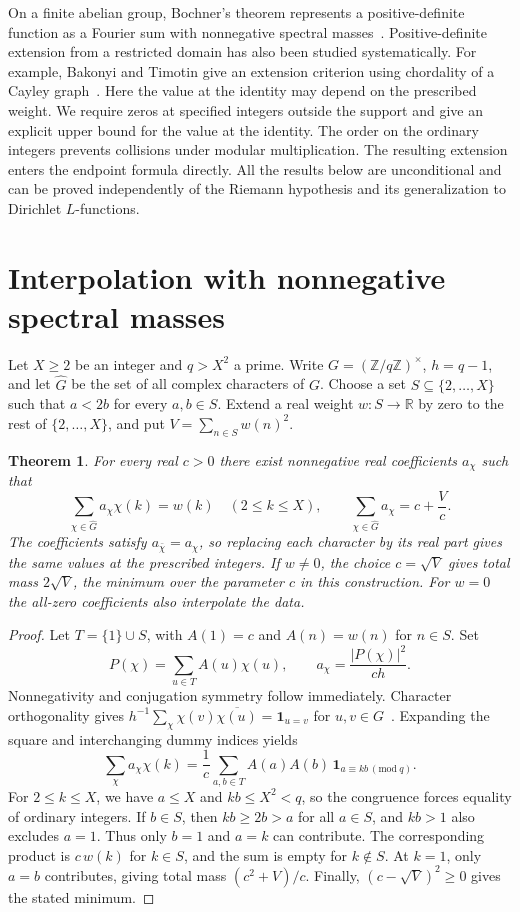 \documentclass[11pt,a4paper]{article}
\newtheorem{theorem}{Theorem}
\newcommand{\ind}{\mathbf{1}}
\newcommand{\R}{\mathbb{R}}
\newcommand{\Z}{\mathbb{Z}}
\begin{document}
On a finite abelian group, Bochner's theorem represents a positive-definite function as a Fourier sum with nonnegative spectral masses~\cite{rudin}. Positive-definite extension from a restricted domain has also been studied systematically. For example, Bakonyi and Timotin give an extension criterion using chordality of a Cayley graph~\cite{bt}. Here the value at the identity may depend on the prescribed weight. We require zeros at specified integers outside the support and give an explicit upper bound for the value at the identity. The order on the ordinary integers prevents collisions under modular multiplication. The resulting extension enters the endpoint formula directly. All the results below are unconditional and can be proved independently of the Riemann hypothesis and its generalization to Dirichlet $L$-functions.

\section{Interpolation with nonnegative spectral masses}
Let $X\ge2$ be an integer and $q>X^2$ a prime. Write $G=(\Z/q\Z)^\times$, $h=q-1$, and let $\widehat G$ be the set of all complex characters of $G$. Choose a set $S\subseteq\{2,\ldots,X\}$ such that $a<2b$ for every $a,b\in S$. Extend a real weight $w\colon S\to\R$ by zero to the rest of $\{2,\ldots,X\}$, and put $V=\sum_{n\in S}w(n)^2$.

\begin{theorem}\label{thm:window}
For every real $c>0$ there exist nonnegative real coefficients $a_\chi$ such that
\[
  \sum_{\chi\in\widehat G}a_\chi\chi(k)=w(k)\quad(2\le k\le X),
  \qquad \sum_{\chi\in\widehat G}a_\chi=c+\frac{V}{c}.
\]
The coefficients satisfy $a_{\bar\chi}=a_\chi$, so replacing each character by its real part gives the same values at the prescribed integers. If $w\ne0$, the choice $c=\sqrt V$ gives total mass $2\sqrt V$, the minimum over the parameter $c$ in this construction. For $w=0$ the all-zero coefficients also interpolate the data.
\end{theorem}

\begin{proof}
Let $T=\{1\}\cup S$, with $A(1)=c$ and $A(n)=w(n)$ for $n\in S$. Set
\[
  P(\chi)=\sum_{u\in T}A(u)\chi(u),
  \qquad a_\chi=\frac{|P(\chi)|^2}{ch}.
\]
Nonnegativity and conjugation symmetry follow immediately. Character orthogonality gives $h^{-1}\sum_\chi\chi(v)\overline{\chi(u)}=\ind_{u=v}$ for $u,v\in G$~\cite{dlmf}. Expanding the square and interchanging dummy indices yields
\[
  \sum_\chi a_\chi\chi(k)=\frac1c\sum_{a,b\in T} A(a)A(b)
     \,\ind_{a\equiv kb\, (\mathrm{mod}\ q)}.
\]
For $2\le k\le X$, we have $a\le X$ and $kb\le X^2<q$, so the congruence forces equality of ordinary integers. If $b\in S$, then $kb\ge2b>a$ for all $a\in S$, and $kb>1$ also excludes $a=1$. Thus only $b=1$ and $a=k$ can contribute. The corresponding product is $c\,w(k)$ for $k\in S$, and the sum is empty for $k\notin S$. At $k=1$, only $a=b$ contributes, giving total mass $(c^2+V)/c$. Finally, $(c-\sqrt V)^2\ge0$ gives the stated minimum.
\end{proof}
\end{document}
